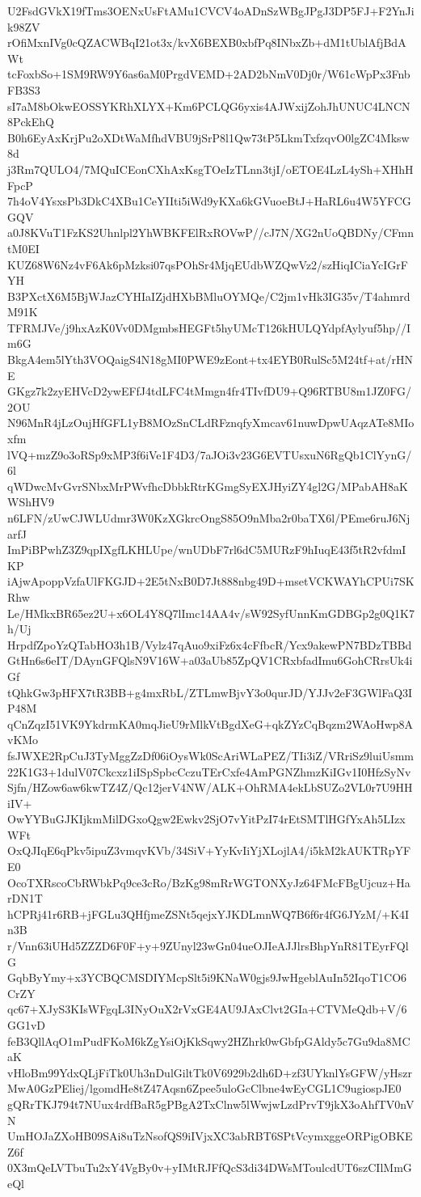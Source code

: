 U2FsdGVkX19fTms3OENxUsFtAMu1CVCV4oADnSzWBgJPgJ3DP5FJ+F2YnJik98ZV
rOfiMxnIVg0cQZACWBqI21ot3x/kvX6BEXB0xbfPq8INbxZb+dM1tUblAfjBdAWt
tcFoxbSo+1SM9RW9Y6as6aM0PrgdVEMD+2AD2bNmV0Dj0r/W61cWpPx3FnbFB3S3
sI7aM8bOkwEOSSYKRhXLYX+Km6PCLQG6yxis4AJWxijZohJhUNUC4LNCN8PckEhQ
B0h6EyAxKrjPu2oXDtWaMfhdVBU9jSrP8l1Qw73tP5LkmTxfzqvO0lgZC4Mksw8d
j3Rm7QULO4/7MQuICEonCXhAxKsgTOeIzTLnn3tjI/oETOE4LzL4ySh+XHhHFpcP
7h4oV4YsxsPb3DkC4XBu1CeYIIti5iWd9yKXa6kGVuoeBtJ+HaRL6u4W5YFCGGQV
a0J8KVuT1FzKS2Uhnlpl2YhWBKFElRxROVwP//cJ7N/XG2nUoQBDNy/CFmntM0EI
KUZ68W6Nz4vF6Ak6pMzksi07qsPOhSr4MjqEUdbWZQwVz2/szHiqICiaYcIGrFYH
B3PXctX6M5BjWJazCYHIaIZjdHXbBMluOYMQe/C2jm1vHk3IG35v/T4ahmrdM91K
TFRMJVe/j9hxAzK0Vv0DMgmbsHEGFt5hyUMcT126kHULQYdpfAylyuf5hp//Im6G
BkgA4em5lYth3VOQaigS4N18gMI0PWE9zEont+tx4EYB0RulSc5M24tf+at/rHNE
GKgz7k2zyEHVcD2ywEFfJ4tdLFC4tMmgn4fr4TIvfDU9+Q96RTBU8m1JZ0FG/2OU
N96MnR4jLzOujHfGFL1yB8MOzSnCLdRFznqfyXmcav61nuwDpwUAqzATe8MIoxfm
lVQ+mzZ9o3oRSp9xMP3f6iVe1F4D3/7aJOi3v23G6EVTUsxuN6RgQb1ClYynG/6l
qWDwcMvGvrSNbxMrPWvfhcDbbkRtrKGmgSyEXJHyiZY4gl2G/MPabAH8aKWShHV9
n6LFN/zUwCJWLUdmr3W0KzXGkrcOngS85O9nMba2r0baTX6l/PEme6ruJ6NjarfJ
ImPiBPwhZ3Z9qpIXgfLKHLUpe/wnUDbF7rl6dC5MURzF9hIuqE43f5tR2vfdmIKP
iAjwApoppVzfaUlFKGJD+2E5tNxB0D7Jt888nbg49D+msetVCKWAYhCPUi7SKRhw
Le/HMkxBR65ez2U+x6OL4Y8Q7lImc14AA4v/sW92SyfUnnKmGDBGp2g0Q1K7h/Uj
HrpdfZpoYzQTabHO3h1B/Vylz47qAuo9xiFz6x4cFfbcR/Ycx9akewPN7BDzTBBd
GtHn6s6eIT/DAynGFQlsN9V16W+a03aUb85ZpQV1CRxbfadImu6GohCRrsUk4iGf
tQhkGw3pHFX7tR3BB+g4mxRbL/ZTLmwBjvY3o0qurJD/YJJv2eF3GWlFaQ3IP48M
qCnZqzI51VK9YkdrmKA0mqJieU9rMlkVtBgdXeG+qkZYzCqBqzm2WAoHwp8AvKMo
fsJWXE2RpCuJ3TyMggZzDf06iOysWk0ScAriWLaPEZ/TIi3iZ/VRriSz9luiUsmm
22K1G3+1dulV07Ckcxz1iISpSpbcCczuTErCxfe4AmPGNZhmzKiIGv1I0HfzSyNv
Sjfn/HZow6aw6kwTZ4Z/Qc12jerV4NW/ALK+OhRMA4ekLbSUZo2VL0r7U9HHiIV+
OwYYBuGJKIjkmMilDGxoQgw2Ewkv2SjO7vYitPzI74rEtSMTlHGfYxAh5LIzxWFt
OxQJIqE6qPkv5ipuZ3vmqvKVb/34SiV+YyKvIiYjXLojlA4/i5kM2kAUKTRpYFE0
OcoTXRscoCbRWbkPq9ce3cRo/BzKg98mRrWGTONXyJz64FMcFBgUjcuz+HarDN1T
hCPRj41r6RB+jFGLu3QHfjmeZSNt5qejxYJKDLmnWQ7B6f6r4fG6JYzM/+K4In3B
r/Vnn63iUHd5ZZZD6F0F+y+9ZUnyl23wGn04ueOJIeAJJlrsBhpYnR81TEyrFQlG
GqbByYmy+x3YCBQCMSDIYMcpSlt5i9KNaW0gjs9JwHgeblAuIn52IqoT1CO6CrZY
qc67+XJyS3KIsWFgqL3INyOuX2rVxGE4AU9JAxClvt2GIa+CTVMeQdb+V/6GG1vD
feB3QllAqO1mPudFKoM6kZgYsiOjKkSqwy2HZhrk0wGbfpGAldy5c7Gu9da8MCaK
vHloBm99YdxQLjFiTk0Uh3nDulGiltTk0V6929b2dh6D+zf3UYknlYsGFW/yHszr
MwA0GzPEliej/lgomdHe8tZ47Aqsn6Zpee5uloGcClbne4wEyCGL1C9ugiospJE0
gQRrTKJ794t7NUux4rdfBaR5gPBgA2TxClnw5lWwjwLzdPrvT9jkX3oAhfTV0nVN
UmHOJaZXoHB09SAi8uTzNsofQS9iIVjxXC3abRBT6SPtVcymxggeORPigOBKEZ6f
0X3mQeLVTbuTu2xY4VgBy0v+yIMtRJFfQcS3di34DWsMToulcdUT6szCIlMmGeQl
